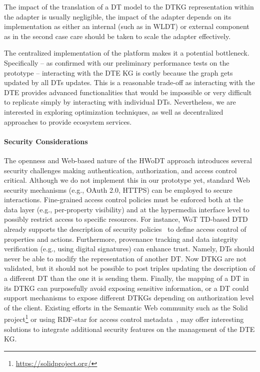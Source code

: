 The impact of the translation of a \ac{DT} model to the \ac{DTKG} representation within the adapter is usually negligible, the impact of the adapter depends on its implementation as either an internal (such as in \ac{WLDT}) or external component as in the second case care should be taken to scale the adapter effectively.

The centralized implementation of the platform makes it a potential bottleneck. Specifically -- as confirmed with our preliminary performance tests on the prototype -- interacting with the \ac{DTE} KG is costly because the graph gets updated by all \acp{DT} updates.
%
This is a reasonable trade-off as interacting with the \ac{DTE} provides advanced functionalities that would be impossible or very difficult to replicate simply by interacting with individual \acp{DT}.
%
Nevertheless, we are interested in exploring optimization techniques, as well as decentralized approaches to provide ecosystem services.


\paragraph{Security Considerations}
The openness and Web-based nature of the \ac{HWoDT} approach introduces several security challenges making authentication, authorization, and access control critical.
Although we do not implement this in our prototype yet, standard Web security mechanisms (e.g., OAuth 2.0, HTTPS) can be employed to secure interactions.
Fine-grained access control policies must be enforced both at the data layer (e.g., per-property visibility) and at the hypermedia interface level to possibly restrict access to specific resources.
For instance, \ac{WoT} \ac{TD}-based \ac{DTD} already supports the description of security policies~\cite{wotthing} to define access control of properties and actions. 
Furthermore, provenance tracking and data integrity verification (e.g., using digital signatures) can enhance trust. Namely, \acp{DT} should never be able to modify the representation of another \ac{DT}. Now \ac{DTKG} are not validated, but it should not be possible to post triples updating the description of a different \ac{DT} than the one it is sending them.
Finally, the mapping of a \ac{DT} in its \ac{DTKG} can purposefully avoid exposing sensitive information, or a \ac{DT} could support mechanisms to expose different \acp{DTKG} depending on authorization level of the client.
Existing efforts in the Semantic Web community such as the Solid project\footnote{\url{https://solidproject.org/}} or using RDF-star for access control metadata~\cite{rdfstar-security}, may offer interesting solutions to integrate additional security features on the management of the \ac{DTE} \ac{KG}. 



